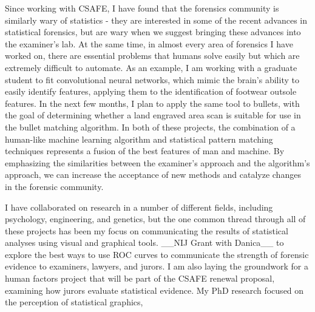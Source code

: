 \documentclass[12pt, letterpaper, sans]{moderncv}
\begin{document}
Since working with CSAFE, I have found that the forensics community is similarly wary of statistics - they are interested in some of the recent advances in statistical forensics, but are wary when we suggest bringing these advances into the examiner's lab. At the same time, in almost every area of forensics I have worked on, there are essential problems that humans solve easily but which are extremely difficult to automate. As an example, I am working with a graduate student to fit convolutional neural networks, which mimic the brain's ability to easily identify features, applying them to the identification of footwear outsole features. In the next few months, I plan to apply the same tool to bullets, with the goal of determining whether a land engraved area scan is suitable for use in the bullet matching algorithm. In both of these projects, the combination of a human-like machine learning algorithm and statistical pattern matching techniques represents a fusion of the best features of man and machine. By emphasizing the similarities between the examiner's approach and the algorithm's approach, we can increase the acceptance of new methods and catalyze changes in the forensic community.

I have collaborated on research in a number of different fields, including psychology, engineering, and genetics, but the one common thread through all of these projects has been my focus on communicating the results of statistical analyses using visual and graphical tools. __NIJ Grant with Danica__ to explore the best ways to use ROC curves to communicate the strength of forensic evidence to examiners, lawyers, and jurors. I am also laying the groundwork for a human factors project that will be part of the CSAFE renewal proposal, examining how jurors evaluate statistical evidence. My PhD research focused on the perception of statistical graphics, 



\end{document}
